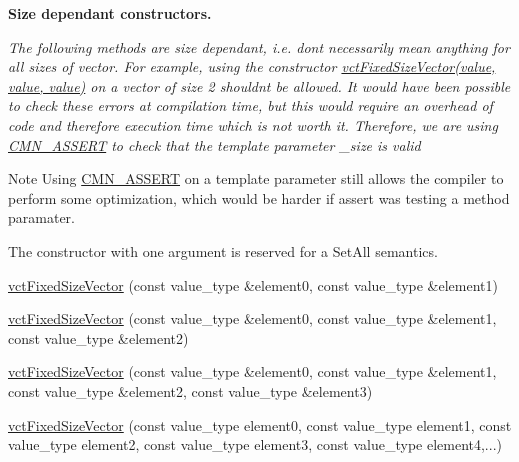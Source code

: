 \begin{Indent}{\bf Size dependant constructors.}\par
{\em The following methods are size dependant, i.\+e. don\textquotesingle{}t necessarily mean anything for all sizes of vector. For example, using the constructor \hyperlink{classvct_fixed_size_vector}{vct\+Fixed\+Size\+Vector(value, value, value)} on a vector of size 2 shouldn\textquotesingle{}t be allowed. It would have been possible to check these errors at compilation time, but this would require an overhead of code and therefore execution time which is not worth it. Therefore, we are using \hyperlink{group__cisst_common_ga6a12b7031ea38ac5bf5937b8633c97ff}{C\+M\+N\+\_\+\+A\+S\+S\+E\+R\+T} to check that the template parameter \+\_\+size is valid

\begin{DoxyNote}{Note}
Using \hyperlink{group__cisst_common_ga6a12b7031ea38ac5bf5937b8633c97ff}{C\+M\+N\+\_\+\+A\+S\+S\+E\+R\+T} on a template parameter still allows the compiler to perform some optimization, which would be harder if assert was testing a method paramater.

The constructor with one argument is reserved for a Set\+All semantics. 
\end{DoxyNote}
}\begin{DoxyCompactItemize}
\item 
\hyperlink{classvct_fixed_size_vector_ac2cbbed5bc559da583f3d46fa59dbb67}{vct\+Fixed\+Size\+Vector} (const value\+\_\+type \&element0, const value\+\_\+type \&element1)
\item 
\hyperlink{classvct_fixed_size_vector_a94255928c63b2be209b0506186c28460}{vct\+Fixed\+Size\+Vector} (const value\+\_\+type \&element0, const value\+\_\+type \&element1, const value\+\_\+type \&element2)
\item 
\hyperlink{classvct_fixed_size_vector_a48b58bbc8ce7ce4cdfc6add64e407048}{vct\+Fixed\+Size\+Vector} (const value\+\_\+type \&element0, const value\+\_\+type \&element1, const value\+\_\+type \&element2, const value\+\_\+type \&element3)
\item 
\hyperlink{classvct_fixed_size_vector_ad2fabc2335b24ceb7aefbeadf5385b3a}{vct\+Fixed\+Size\+Vector} (const value\+\_\+type element0, const value\+\_\+type element1, const value\+\_\+type element2, const value\+\_\+type element3, const value\+\_\+type element4,...)
\end{DoxyCompactItemize}
\end{Indent}
{\bf }\par
